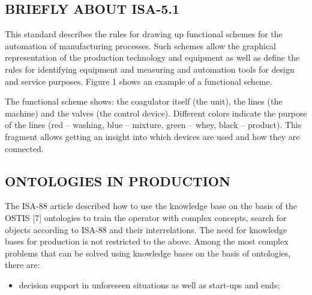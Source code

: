 \documentclass[12pt]{article}
\begin{document}
\begin{multicols}{2}
\vspace{0.2cm}
\begin{center}
    \section{\small BRIEFLY ABOUT ISA-5.1}
\end{center}
\vspace{-0.8cm}

\normalsize{This standard describes the rules for drawing up
functional schemes for the automation of manufacturing
processes. Such schemes allow the graphical representation of the production technology and equipment as
well as define the rules for identifying equipment and
measuring and automation tools for design and service
purposes. Figure 1 shows an example of a functional
scheme.}
\par
\setlength\parindent{1.5em}
\normalsize{The functional scheme shows: the coagulator itself (the
unit), the lines (the machine) and the valves (the control
device). Different colors indicate the purpose of the lines
(red – washing, blue – mixture, green – whey, black –
product). This fragment allows getting an insight into
which devices are used and how they are connected.
}

\vspace{-0.4cm}
\begin{center}
\section{\small ONTOLOGIES IN PRODUCTION}
\end{center}
\vspace{-0.5cm}

\normalsize{The ISA-88 article described how to use the knowledge
base on the basis of the OSTIS [7] ontologies to train
the operator with complex concepts, search for objects
according to ISA-88 and their interrelations. The need for
knowledge bases for production is not restricted to the
above. Among the most complex problems that can be
solved using knowledge bases on the basis of ontologies,
there are:}
\begin{itemize}
\item decision support in unforeseen situations as well as
start-ups and ends;
\end{itemize}
\end{multicols}
\end{document}
